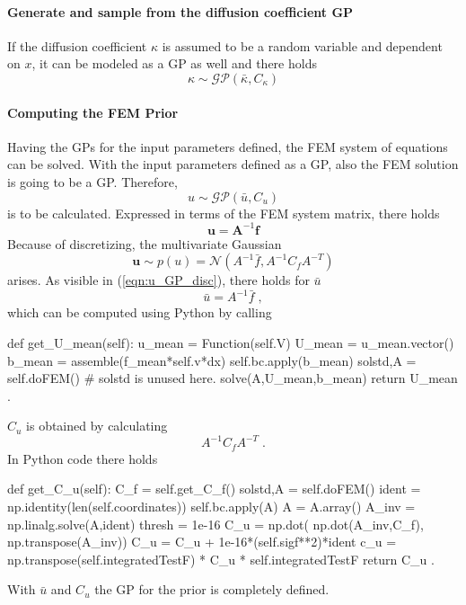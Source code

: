 \documentclass[%
  a4paper,oneside,%
  11pt,%
  smallchapters,
  green,%
  rgb, <cmyk>
  ,]{tubsbook}
\begin{document}
\paragraph{Generate and sample from the diffusion coefficient GP}
If the diffusion coefficient $\kappa$ is assumed to be a random variable and dependent on $x$, it can be modeled as a GP as well and there holds
\begin{equation}
\kappa \sim \mathcal{GP}(\bar{\kappa},C_{\kappa})
\end{equation}

\paragraph{Computing the FEM Prior}
Having the GPs for the input parameters defined, the FEM system of equations can be solved. With the input parameters defined as a GP, also the FEM solution is going to be a GP. Therefore, 
\begin{equation}
u \sim \mathcal{GP}(\bar{u}, C_u)
\end{equation}
is to be calculated. Expressed in terms of the FEM system matrix, there holds
\begin{equation}
\bm{u} = \bm{A}^{-1}\bm{f}
\end{equation}
Because of discretizing, the multivariate Gaussian
\begin{equation}
\bm{u} \sim p(u) = \mathcal{N} \left( A^{-1} \bar{f}, A^{-1} C_f A^{-T}  \right)
\label{eqn:u_GP_disc}
\end{equation}
arises.
As visible in (\ref{eqn:u_GP_disc}), there holds for $\bar{u}$
\begin{equation}
\bar{u} = A^{-1} \bar{f} \; ,
\end{equation}
which can be computed using Python by calling
\begin{python}
def get_U_mean(self):
	u_mean = Function(self.V)
	U_mean = u_mean.vector()
	b_mean = assemble(f_mean*self.v*dx) 
	self.bc.apply(b_mean)
	solstd,A = self.doFEM()  # solstd is unused here.
	solve(A,U_mean,b_mean)
	return U_mean .
\end{python}
\label{lst:get_u_mean}
$C_u$ is obtained by calculating
\begin{equation}
A^{-1} C_f A^{-T} \; .
\end{equation}
In Python code there holds
\begin{python}
def get_C_u(self):
	C_f = self.get_C_f()
	solstd,A = self.doFEM()
	ident = np.identity(len(self.coordinates))
	self.bc.apply(A)
	A = A.array()
	A_inv = np.linalg.solve(A,ident)
	thresh = 1e-16
	C_u = np.dot( np.dot(A_inv,C_f), np.transpose(A_inv))
	C_u = C_u + 1e-16*(self.sigf**2)*ident
	c_u = np.transpose(self.integratedTestF) * C_u * self.integratedTestF
	return C_u .
\end{python}
\label{lst:get_C_u}
With $\bar{u}$ and $C_u$ the GP for the prior is completely defined. 
\end{document}
